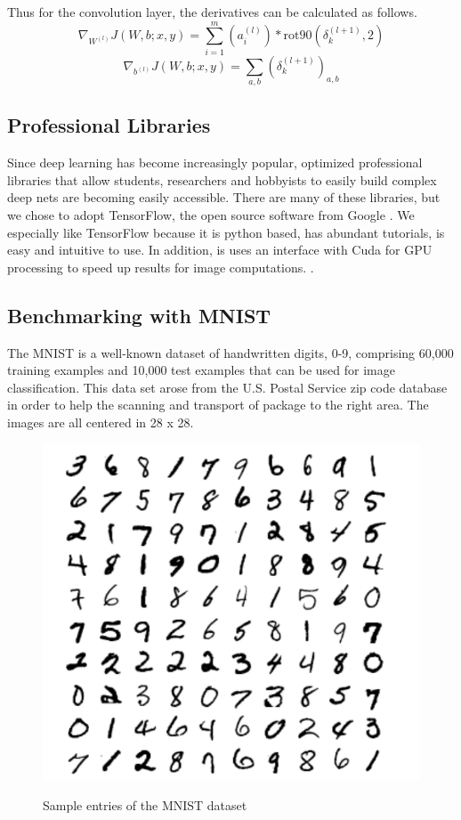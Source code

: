 \documentclass[12pt, twocolumn]{article}
\begin{document}
Thus for the convolution layer, the derivatives can be calculated as follows.
\begin{equation}
\nabla_{W^{(l)}}J(W,b;x,y) = \sum_{i=1}^m (a^{(l)}_i) \ast \textrm{rot90}( \delta^{(l+1)}_k,2)
\end{equation}
\begin{equation}
\nabla_{b^{(l)}}J(W,b;x,y)= \sum_{a,b}(\delta^{(l+1)}_k)_{a,b}
\end{equation}


\subsection{Professional Libraries}

Since deep learning has become increasingly popular, optimized professional libraries that allow students, researchers and hobbyists to easily build complex deep nets are becoming easily accessible. There are many of these libraries, but we chose to adopt TensorFlow, the open source software from Google \cite{TensorFlowGH}. We especially like TensorFlow because it is python based, has abundant tutorials, is easy and intuitive to use. In addition, is uses an interface with Cuda for GPU processing to speed up results for image computations. \cite{TensorFlowWeb}. 



\subsection{Benchmarking with MNIST}


The MNIST is a well-known dataset of handwritten digits, 0-9, comprising 60,000 training examples and 10,000 test examples \cite{MNIST}  that can be used for image classification.  This data set arose from the U.S. Postal Service zip code database in order to help the scanning and transport of package to the right area. The images are all centered in 28 x 28.

\begin{figure}
\includegraphics[scale=.8]{MNISTnos.png}
\label{fig:MNISTex}
\caption{Sample entries of the MNIST dataset \cite{LeCun1998}}
\end{figure}
\end{document}
